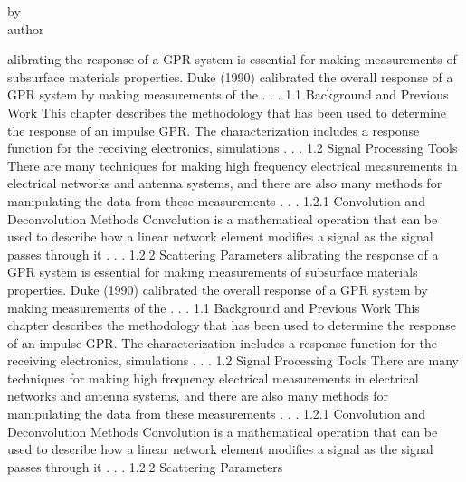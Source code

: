 \documentclass[12pt]{mines-thesis}
\begin{document}
\clearpage
\vspace*{\fill}
\begin{center}
	\begin{minipage}{\textwidth}
\end{minipage}
\end{center}
\vspace{\fill}
\begin{center}
	by\\
	author
\end{center}
\clearpage
alibrating the response of a GPR system is essential for making measurements of subsurface materials properties. Duke (1990) calibrated the overall response of a GPR system by making measurements of the . . .
1.1 Background and Previous Work
This chapter describes the methodology that has been used to determine the response of an impulse GPR. The characterization includes a response function for the receiving electronics, simulations . . .
1.2 Signal Processing Tools
There are many techniques for making high frequency electrical measurements in electrical networks and antenna systems, and there are also many methods for manipulating the data from these measurements . . .
1.2.1 Convolution and Deconvolution Methods
Convolution is a mathematical operation that can be used to describe how a linear network element modifies a signal as the signal passes through it . . .
1.2.2 Scattering Parameters
\newpage
alibrating the response of a GPR system is essential for making measurements of subsurface materials properties. Duke (1990) calibrated the overall response of a GPR system by making measurements of the . . .
1.1 Background and Previous Work
This chapter describes the methodology that has been used to determine the response of an impulse GPR. The characterization includes a response function for the receiving electronics, simulations . . .
1.2 Signal Processing Tools
There are many techniques for making high frequency electrical measurements in electrical networks and antenna systems, and there are also many methods for manipulating the data from these measurements . . .
1.2.1 Convolution and Deconvolution Methods
Convolution is a mathematical operation that can be used to describe how a linear network element modifies a signal as the signal passes through it . . .
1.2.2 Scattering Parameters
\end{document}
